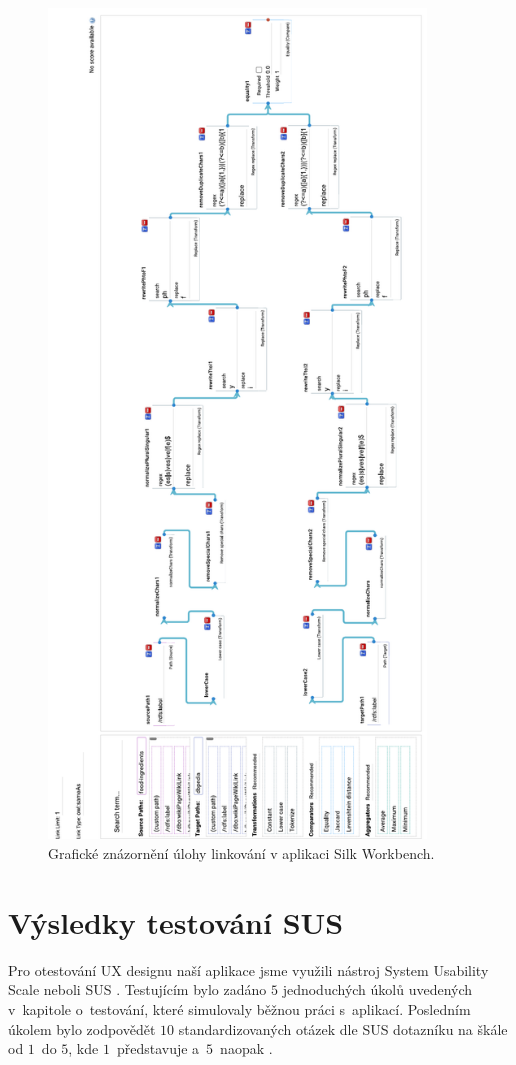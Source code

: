 \documentclass[12pt,a4paper]{report}
\begin{document}
\begin{figure}[h!]\centering
\includegraphics[height=220mm]{../img/silk-workbench}
\caption{Grafické znázornění úlohy linkování v aplikaci Silk Workbench.}
\label{obr0a:silk-workbench}
\end{figure}

\section{Výsledky testování SUS}

Pro otestování UX designu naší aplikace jsme využili nástroj System Usability Scale neboli SUS \citep{sus-test}. Testujícím bylo zadáno $5$ jednoduchých úkolů uvedených v~kapitole o~testování, které simulovaly běžnou práci s~aplikací. Posledním úkolem bylo zodpovědět $10$ standardizovaných otázek dle SUS dotazníku na škále od $1$~do $5$, kde $1$~představuje  a~$5$~naopak . 
\end{document}
